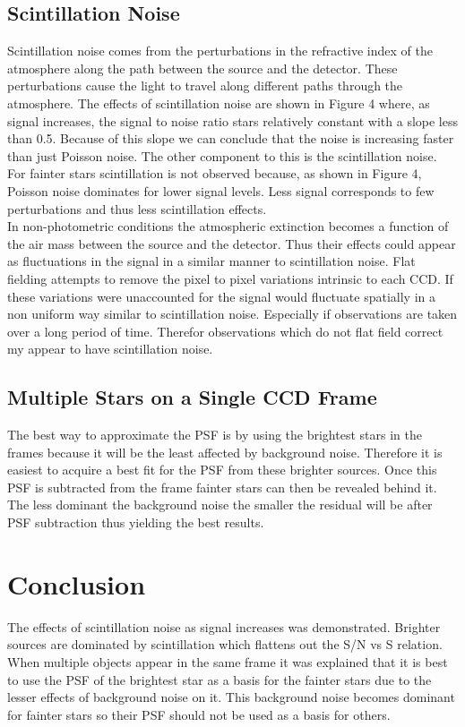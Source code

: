 \documentclass{article}
\begin{document}
\subsection{Scintillation Noise}
Scintillation noise comes from the perturbations in the refractive index of the atmosphere along the path between the source and the detector. These perturbations cause the light to travel along different paths through the atmosphere. The effects of scintillation noise are shown in Figure 4 where, as signal increases, the signal to noise ratio stars relatively constant with a slope less than 0.5. Because of this slope we can conclude that the noise is increasing faster than just Poisson noise. The other component to this is the scintillation noise.\\

For fainter stars scintillation is not observed because, as shown in Figure 4, Poisson noise dominates for lower signal levels. Less signal corresponds to few perturbations and thus less scintillation effects.\\
In non-photometric conditions the atmospheric extinction becomes a function of the air mass between the source and the detector. Thus their effects could appear as fluctuations in the signal in a similar manner to scintillation noise. Flat fielding attempts to remove the pixel to pixel variations intrinsic to each CCD. If these variations were unaccounted for the signal would fluctuate spatially in a non uniform way similar to scintillation noise. Especially if observations are taken over a long period of time. Therefor observations which do not flat field correct my appear to have scintillation noise.
\subsection{Multiple Stars on a Single CCD Frame}
The best way to approximate the PSF is by using the brightest stars in the frames because it will be the least affected by background noise. Therefore it is easiest to acquire a best fit for the PSF from these brighter sources. Once this PSF is subtracted from the frame fainter stars can then be revealed behind it. The less dominant the background noise the smaller the residual will be after PSF subtraction thus yielding the best results.
\section{Conclusion}
The effects of scintillation noise as signal increases was demonstrated. Brighter sources are dominated by scintillation which flattens out the S/N vs S relation. When multiple objects appear in the same frame it was explained that it is best to use the PSF of the brightest star as a basis for the fainter stars due to the lesser effects of background noise on it. This background noise becomes dominant for fainter stars so their PSF should not be used as a basis for others.\\
\end{document}
